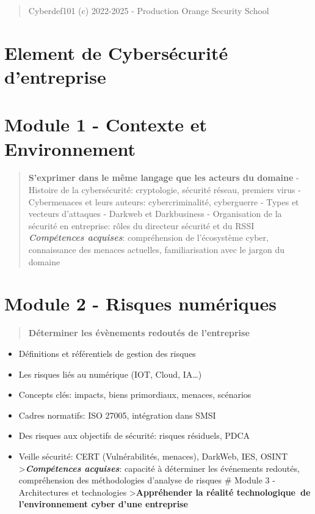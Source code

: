 \begin{quote}
Cyberdef101 (c) 2022-2025 - Production Orange Security School
\end{quote}

\section{Element de Cybersécurité
d'entreprise}\label{element-de-cybersuxe9curituxe9-dentreprise}

\section{Module 1 - Contexte et
Environnement}\label{module-1---contexte-et-environnement}

\begin{quote}
\textbf{S'exprimer dans le même langage que les acteurs du domaine} -
Histoire de la cybersécurité: cryptologie, sécurité réseau, premiers
virus - Cybermenaces et leurs auteurs: cybercriminalité, cyberguerre -
Types et vecteurs d'attaques - Darkweb et Darkbusiness - Organisation de
la sécurité en entreprise: rôles du directeur sécurité et du RSSI
\textbf{\emph{Compétences acquises}}: compréhension de l'écosystème
cyber, connaissance des menaces actuelles, familiarisation avec le
jargon du domaine
\end{quote}

\section{Module 2 - Risques
numériques}\label{module-2---risques-numuxe9riques}

\begin{quote}
\textbf{Déterminer les évènements redoutés de l'entreprise}
\end{quote}

\begin{itemize}
\tightlist
\item
  Définitions et référentiels de gestion des risques
\item
  Les risques liés au numérique (IOT, Cloud, IA\ldots)
\item
  Concepts clés: impacts, biens primordiaux, menaces, scénarios
\item
  Cadres normatifs: ISO 27005, intégration dans SMSI
\item
  Des risques aux objectifs de sécurité: risques résiduels, PDCA
\item
  Veille sécurité: CERT (Vulnérabilités, menaces), DarkWeb, IES, OSINT
  \textgreater{}\textbf{\emph{Compétences acquises}}: capacité à
  déterminer les événements redoutés, compréhension des méthodologies
  d'analyse de risques \# Module 3 - Architectures et technologies
  \textgreater{}\textbf{Appréhender la réalité technologique~de
  l'environnement cyber d'une entreprise}
\end{itemize}

